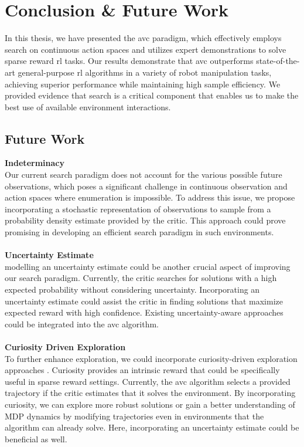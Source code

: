 
\chapter{Conclusion & Future Work}
\label{chapter:Conc_Fut}
In this thesis, we have presented the \ac{avc} paradigm, which effectively employs search on continuous action spaces and utilizes 
expert demonstrations to solve sparse reward \ac{rl} tasks. Our results demonstrate that \ac{avc} 
outperforms state-of-the-art general-purpose \ac{rl} algorithms in a variety of robot manipulation tasks, achieving superior performance 
while maintaining high sample efficiency. We provided evidence that search is a critical component that enables us to make the best use of available 
environment interactions.

\section{Future Work}
\textbf{Indeterminacy}\\
Our current search paradigm does not account for the various possible future observations, which poses a significant challenge in 
continuous observation and action spaces where enumeration is impossible. To address this issue, we propose incorporating a stochastic 
representation of observations to sample from a probability density estimate provided by the critic. 
This approach could prove promising in developing an efficient search paradigm in such environments. \\ \\

\textbf{Uncertainty Estimate}\\
modelling an uncertainty estimate could be another crucial aspect of improving our search paradigm. 
Currently, the critic searches for solutions with a high expected probability without considering uncertainty. 
Incorporating an uncertainty estimate could assist the critic in finding solutions that maximize expected reward with high confidence. 
Existing uncertainty-aware approaches \cite{gawlikowski2022survey,liu2022simple} 
could be integrated into the \ac{avc} algorithm.\\ \\

\textbf{Curiosity Driven Exploration}\\
To further enhance exploration, we could incorporate curiosity-driven exploration approaches \cite{pathak2017curiositydriven}. 
Curiosity provides an intrinsic reward that could be specifically useful in sparse reward settings. 
Currently, the \ac{avc} algorithm selects a provided trajectory if the critic estimates that it solves the environment. By incorporating curiosity, 
we can explore more robust solutions or gain a better understanding of MDP dynamics by modifying trajectories even in environments that the 
algorithm can already solve. Here, incorporating an uncertainty estimate could be beneficial as well.